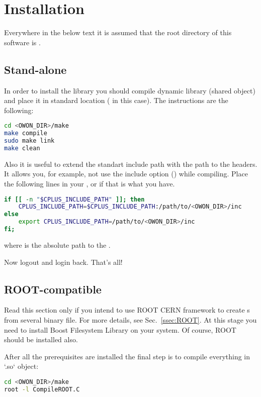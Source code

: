 \section{Installation}\label{sec:install}
Everywhere in the below text it is assumed that the root directory of this software is
.

\subsection{Stand-alone}
In order to install the library you should compile dynamic library (shared object) and
place it in standard location ( in this case). The instructions are the
following:
\begin{lstlisting}[language=bash]
cd <OWON_DIR>/make
make compile
sudo make link 
make clean
\end{lstlisting}

Also it is useful to extend the standart include path with the path to the headers. It
allows you, for example, not use the include option () while compiling. Place
the following lines in your , or  if that is
what you have.
\begin{lstlisting}[language=bash]
if [[ -n "$CPLUS_INCLUDE_PATH" ]]; then
    CPLUS_INCLUDE_PATH=$CPLUS_INCLUDE_PATH:/path/to/<OWON_DIR>/inc
else
    export CPLUS_INCLUDE_PATH=/path/to/<OWON_DIR>/inc
fi;
\end{lstlisting}
where  is the absolute path to the .

Now logout and login back. That's all!

\subsection{ROOT-compatible}\label{ssec:install:ROOT}
Read this section only if you intend to use ROOT CERN framework to create s
from several binary file. For more details, see Sec.~\ref{ssec:ROOT}.
At this stage you need to install Boost Filesystem Library on your system. Of course, ROOT should be installed also.

After all the prerequisites are installed the final step is to compile everything in `.so` object:
\begin{lstlisting}[language=bash]
cd <OWON_DIR>/make
root -l CompileROOT.C
\end{lstlisting}
